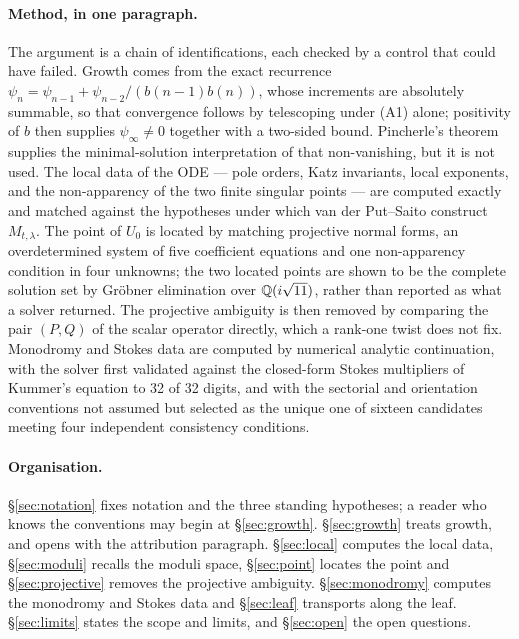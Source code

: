 \paragraph{Method, in one paragraph.} The argument is a chain of
identifications, each checked by a control that could have failed. Growth comes
from the exact recurrence
$\psi_n=\psi_{n-1}+\psi_{n-2}/(b(n-1)b(n))$, whose increments are absolutely
summable, so that convergence follows by telescoping under (A1) alone;
positivity of $b$ then supplies $\psi_\infty\neq0$ together with a two-sided
bound. Pincherle's theorem supplies the minimal-solution interpretation of that
non-vanishing, but it is not used. The local data of the ODE --- pole orders,
Katz invariants, local exponents, and the non-apparency of the two finite
singular points --- are computed exactly and matched against the hypotheses
under which van der Put--Saito construct $M_{t,\lambda}$. The point of $U_0$ is
located by matching projective normal forms, an overdetermined system of five
coefficient equations and one non-apparency condition in four unknowns; the two
located points are shown to be the complete solution set by Gr\"obner
elimination over $\mathbb{Q}(i\sqrt{11})$, rather than reported as what a solver
returned. The projective ambiguity is then removed by comparing the pair
$(P,Q)$ of the scalar operator directly, which a rank-one twist does not fix.
Monodromy and Stokes data are computed by numerical analytic continuation, with
the solver first validated against the closed-form Stokes multipliers of
Kummer's equation to 32 of 32 digits, and with the sectorial and orientation
conventions not assumed but selected as the unique one of sixteen candidates
meeting four independent consistency conditions.

\paragraph{Organisation.} \S\ref{sec:notation} fixes notation and the three
standing hypotheses; a reader who knows the conventions may begin at
\S\ref{sec:growth}. \S\ref{sec:growth} treats growth, and opens with the
attribution paragraph. \S\ref{sec:local} computes the local data,
\S\ref{sec:moduli} recalls the moduli space, \S\ref{sec:point} locates the
point and \S\ref{sec:projective} removes the projective ambiguity.
\S\ref{sec:monodromy} computes the monodromy and Stokes data and
\S\ref{sec:leaf} transports along the leaf. \S\ref{sec:limits} states the scope
and limits, and \S\ref{sec:open} the open questions.
